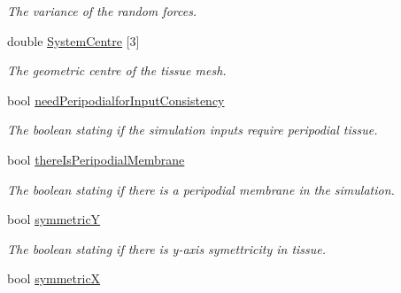 \begin{DoxyCompactItemize}
\begin{DoxyCompactList}\small\item\em The variance of the random forces. \end{DoxyCompactList}\item 
\hypertarget{classSimulation_a3229dca48a5d49bbcd641f74605341c0}{}double \hyperlink{classSimulation_a3229dca48a5d49bbcd641f74605341c0}{System\+Centre} \mbox{[}3\mbox{]}\label{classSimulation_a3229dca48a5d49bbcd641f74605341c0}

\begin{DoxyCompactList}\small\item\em The geometric centre of the tissue mesh. \end{DoxyCompactList}\item 
\hypertarget{classSimulation_a31d908b8560f3da1a2524481c970449c}{}bool \hyperlink{classSimulation_a31d908b8560f3da1a2524481c970449c}{need\+Peripodialfor\+Input\+Consistency}\label{classSimulation_a31d908b8560f3da1a2524481c970449c}

\begin{DoxyCompactList}\small\item\em The boolean stating if the simulation inputs require peripodial tissue. \end{DoxyCompactList}\item 
\hypertarget{classSimulation_a43db0752ce3c4d11a6268e7896a021f0}{}bool \hyperlink{classSimulation_a43db0752ce3c4d11a6268e7896a021f0}{there\+Is\+Peripodial\+Membrane}\label{classSimulation_a43db0752ce3c4d11a6268e7896a021f0}

\begin{DoxyCompactList}\small\item\em The boolean stating if there is a peripodial membrane in the simulation. \end{DoxyCompactList}\item 
\hypertarget{classSimulation_aa6b15db1d6838c8387e3cce18dc469b1}{}bool \hyperlink{classSimulation_aa6b15db1d6838c8387e3cce18dc469b1}{symmetric\+Y}\label{classSimulation_aa6b15db1d6838c8387e3cce18dc469b1}

\begin{DoxyCompactList}\small\item\em The boolean stating if there is y-\/axis symettricity in tissue. \end{DoxyCompactList}\item 
\hypertarget{classSimulation_ab224011afb730f28d57d12db3160c4ed}{}bool \hyperlink{classSimulation_ab224011afb730f28d57d12db3160c4ed}{symmetric\+X}\label{classSimulation_ab224011afb730f28d57d12db3160c4ed}


\end{DoxyCompactItemize}
